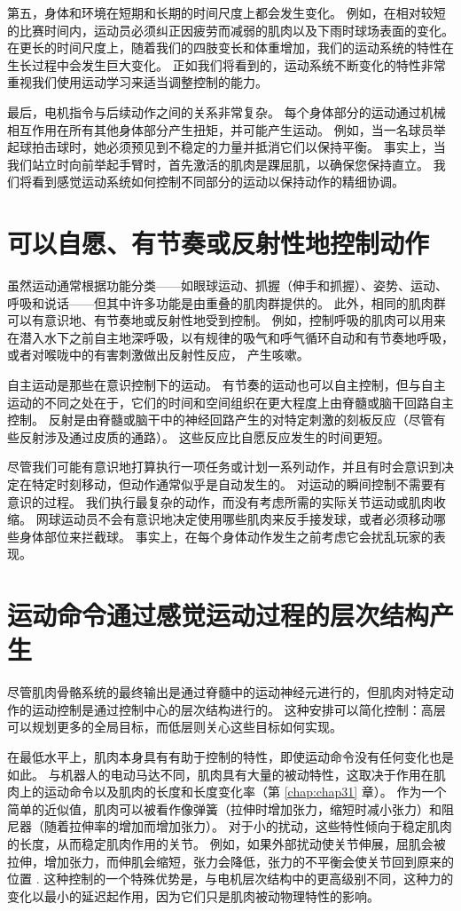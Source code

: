 第五，身体和环境在短期和长期的时间尺度上都会发生变化。 例如，在相对较短的比赛时间内，运动员必须纠正因疲劳而减弱的肌肉以及下雨时球场表面的变化。 在更长的时间尺度上，随着我们的四肢变长和体重增加，我们的运动系统的特性在生长过程中会发生巨大变化。 正如我们将看到的，运动系统不断变化的特性非常重视我们使用运动学习来适当调整控制的能力。

最后，电机指令与后续动作之间的关系非常复杂。 每个身体部分的运动通过机械相互作用在所有其他身体部分产生扭矩，并可能产生运动。 例如，当一名球员举起球拍击球时，她必须预见到不稳定的力量并抵消它们以保持平衡。 事实上，当我们站立时向前举起手臂时，首先激活的肌肉是踝屈肌，以确保您保持直立。 我们将看到感觉运动系统如何控制不同部分的运动以保持动作的精细协调。


\section{可以自愿、有节奏或反射性地控制动作}

虽然运动通常根据功能分类——如眼球运动、抓握（伸手和抓握）、姿势、运动、呼吸和说话——但其中许多功能是由重叠的肌肉群提供的。 此外，相同的肌肉群可以有意识地、有节奏地或反射性地受到控制。 例如，控制呼吸的肌肉可以用来在潜入水下之前自主地深呼吸，以有规律的吸气和呼气循环自动和有节奏地呼吸，或者对喉咙中的有害刺激做出反射性反应， 产生咳嗽。

自主运动是那些在意识控制下的运动。 有节奏的运动也可以自主控制，但与自主运动的不同之处在于，它们的时间和空间组织在更大程度上由脊髓或脑干回路自主控制。 反射是由脊髓或脑干中的神经回路产生的对特定刺激的刻板反应（尽管有些反射涉及通过皮质的通路）。 这些反应比自愿反应发生的时间更短。

尽管我们可能有意识地打算执行一项任务或计划一系列动作，并且有时会意识到决定在特定时刻移动，但动作通常似乎是自动发生的。 对运动的瞬间控制不需要有意识的过程。 我们执行最复杂的动作，而没有考虑所需的实际关节运动或肌肉收缩。 网球运动员不会有意识地决定使用哪些肌肉来反手接发球，或者必须移动哪些身体部位来拦截球。 事实上，在每个身体动作发生之前考虑它会扰乱玩家的表现。


\section{运动命令通过感觉运动过程的层次结构产生}

尽管肌肉骨骼系统的最终输出是通过脊髓中的运动神经元进行的，但肌肉对特定动作的运动控制是通过控制中心的层次结构进行的。 这种安排可以简化控制：高层可以规划更多的全局目标，而低层则关心这些目标如何实现。

在最低水平上，肌肉本身具有有助于控制的特性，即使运动命令没有任何变化也是如此。 与机器人的电动马达不同，肌肉具有大量的被动特性，这取决于作用在肌肉上的运动命令以及肌肉的长度和长度变化率（第 \ref{chap:chap31} 章）。 作为一个简单的近似值，肌肉可以被看作像弹簧（拉伸时增加张力，缩短时减小张力）和阻尼器（随着拉伸率的增加而增加张力）。 对于小的扰动，这些特性倾向于稳定肌肉的长度，从而稳定肌肉作用的关节。 例如，如果外部扰动使关节伸展，屈肌会被拉伸，增加张力，而伸肌会缩短，张力会降低，张力的不平衡会使关节回到原来的位置 . 这种控制的一个特殊优势是，与电机层次结构中的更高级别不同，这种力的变化以最小的延迟起作用，因为它们只是肌肉被动物理特性的影响。

